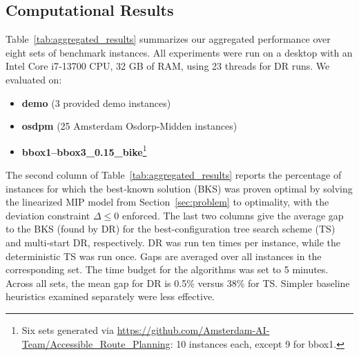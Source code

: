 \documentclass{article}
\begin{document}
\subsection{Computational Results}
\label{sec:experiments}

Table~\ref{tab:aggregated_results} summarizes our aggregated performance over eight sets of benchmark instances.  All experiments were run on a desktop with an Intel Core i7‑13700 CPU, 32 GB of RAM, using 23 threads for DR runs.
We evaluated on:
\begin{itemize}
  \item \textbf{demo} (3 provided demo instances)
  \item \textbf{osdpm} (25 Amsterdam Osdorp‑Midden instances)
  \item \textbf{bbox1–bbox3\_0.15\_bike}\footnote{Six sets generated via \url{https://github.com/Amsterdam-AI-Team/Accessible_Route_Planning}: 10 instances each, except 9 for bbox1.}
\end{itemize}

The second column of Table~\ref{tab:aggregated_results} reports the percentage of instances for which the best‑known solution (BKS) was proven optimal by solving the linearized MIP model from Section~\ref{sec:problem} to optimality, with the deviation constraint $\Delta\le 0$ enforced. The last two columns give the average gap to the BKS (found by DR) for the best-configuration tree search scheme (TS) and multi‑start DR, respectively. DR was run ten times per instance, while the deterministic TS was run once. Gaps are averaged over all instances in the corresponding set. The time budget for the algorithms was set to 5 minutes. Across all sets, the mean gap for DR is 0.5\% versus 38\% for TS. Simpler baseline heuristics examined separately were less effective.
\end{document}
